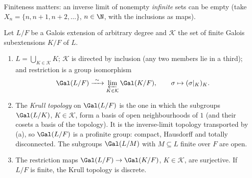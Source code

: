 Finiteness matters: an inverse limit of nonempty \emph{infinite} sets can be empty (take $X_n=\{n,n+1,n+2,\dots\}$, $n\in\N$, with the inclusions as maps).

\begin{proposition}\label{prop:galois:infinite}
Let $L/F$ be a Galois extension of arbitrary degree and $\mathcal{K}$ the set of finite Galois subextensions $K/F$ of $L$.
\begin{enumerate}[label=(\alph*)]
\item $L=\bigcup_{K\in\mathcal{K}}K$; $\mathcal{K}$ is directed by inclusion (any two members lie in a third); and restriction is a group isomorphism
\[
\Gal(L/F)\xrightarrow{\ \sim\ }\varprojlim_{K\in\mathcal{K}}\Gal(K/F),\qquad\sigma\mapsto(\sigma|_K)_K .
\]
\item The \emph{Krull topology} on $\Gal(L/F)$ is the one in which the subgroups $\Gal(L/K)$, $K\in\mathcal{K}$, form a basis of open neighbourhoods of $1$ (and their
cosets a basis of the topology). It is the inverse-limit topology transported by (a), so $\Gal(L/F)$ is a profinite group: compact, Hausdorff and totally
disconnected. The subgroups $\Gal(L/M)$ with $M\subseteq L$ finite over $F$ are open.
\item The restriction maps $\Gal(L/F)\to\Gal(K/F)$, $K\in\mathcal{K}$, are surjective. If $L/F$ is finite, the Krull topology is discrete.
\end{enumerate}
\end{proposition}

